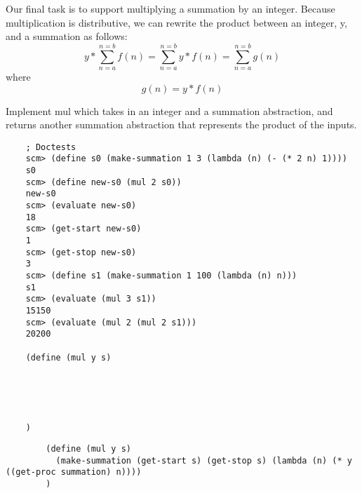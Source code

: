 \begin{blocksection}
    \question Our final task is to support multiplying a summation by an integer. 
    Because multiplication is distributive, we can rewrite the product between an integer, y, and a summation as follows:
     $$ y * \sum_{n=a}^{n=b}f(n) = \sum_{n=a}^{n=b}y * f(n) = \sum_{n=a}^{n=b}g(n)$$ where $$ g(n) = y * f(n) $$ 
     
     Implement mul which takes in an integer and a summation abstraction, and returns another summation abstraction 
     that represents the product of the inputs.

    \begin{lstlisting}
    ; Doctests
    scm> (define s0 (make-summation 1 3 (lambda (n) (- (* 2 n) 1))))
    s0
    scm> (define new-s0 (mul 2 s0))
    new-s0
    scm> (evaluate new-s0)
    18
    scm> (get-start new-s0)
    1
    scm> (get-stop new-s0)
    3
    scm> (define s1 (make-summation 1 100 (lambda (n) n)))
    s1
    scm> (evaluate (mul 3 s1))
    15150
    scm> (evaluate (mul 2 (mul 2 s1)))
    20200

    (define (mul y s)
    
    
    
    

    )
    \end{lstlisting}
    \begin{solution}[1in]
        \begin{lstlisting}
        (define (mul y s)
          (make-summation (get-start s) (get-stop s) (lambda (n) (* y ((get-proc summation) n))))
        )
        \end{lstlisting}
    \end{solution}
\end{blocksection}
